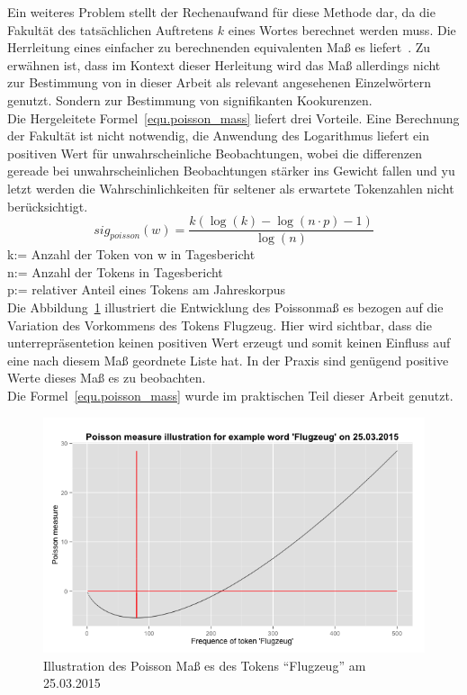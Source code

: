 Ein weiteres Problem stellt der Rechenaufwand für diese Methode dar, da die Fakultät des tatsächlichen Auftretens $k$ eines Wortes berechnet werden muss. Die Herrleitung eines einfacher zu berechnenden 
equivalenten Maß es liefert~\cite[S. 338 ff]{heyer06}. Zu erwähnen ist, dass im Kontext dieser Herleitung wird das Maß allerdings nicht zur Bestimmung von in dieser Arbeit als relevant angesehenen Einzelwörtern genutzt. Sondern zur Bestimmung von signifikanten Kookurenzen. \\
Die Hergeleitete Formel~\ref{equ.poisson_mass} liefert drei Vorteile. Eine Berechnung der Fakultät ist nicht notwendig, die Anwendung des Logarithmus liefert ein positiven Wert für unwahrscheinliche Beobachtungen, wobei die differenzen gereade bei unwahrscheinlichen Beobachtungen stärker ins Gewicht fallen und yu letzt werden die Wahrschinlichkeiten für seltener als erwartete Tokenzahlen nicht berücksichtigt. 
 \begin{equation}\label{equ.poisson_mass}
		sig_{poisson}(w) = \frac{k(\log(k)-\log(n\cdot p) -1)}{\log(n)} 
 \end{equation}
k:= Anzahl der Token von w in Tagesbericht\\
n:= Anzahl der Tokens in Tagesbericht\\
p:= relativer Anteil eines Tokens am Jahreskorpus\\

Die Abbildung~\ref{pic.poisson_mass} illustriert die Entwicklung des Poissonmaß es bezogen auf die Variation des Vorkommens des Tokens Flugzeug. Hier wird sichtbar, dass die unterrepräsentetion keinen positiven Wert erzeugt und somit keinen Einfluss auf eine nach diesem Maß  geordnete Liste hat. In der Praxis sind genügend positive Werte dieses Maß es zu beobachten.\\
Die Formel~\ref{equ.poisson_mass} wurde im praktischen Teil dieser Arbeit genutzt.\\
 
\begin{figure}[h!]
    \centering
    \includegraphics[width=1\textwidth]{pictures/poissonMeasureFlugzeug.png}
    \caption{Illustration des Poisson Maß es des Tokens \enquote{Flugzeug} am 25.03.2015}\label{pic.poisson_mass}
\end{figure}



